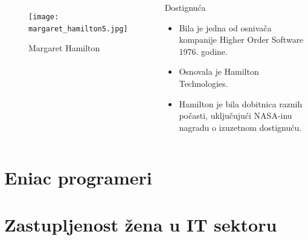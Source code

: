 \documentclass[aspectratio=169]{beamer}
\begin{document}
\begin{frame}
  
    \begin{columns}
        \begin{figure}[h]
    \centering
    \texttt{[image: margaret\_hamilton5.jpg]}
    \caption{Margaret Hamilton}
    \label{fig:my_label}
\end{figure}

        \begin{block}{Dostignuća}
            \begin{itemize}
                \item<1->Bila je jedna od osnivača kompanije Higher Order Software 1976. godine.

                \item<2->Osnovala je Hamilton Technologies.

                \item<3-> Hamilton je bila dobitnica raznih počasti, uključujući NASA-inu nagradu o izuzetnom dostignuću.
                
            \end{itemize}
        \end{block}        
    \end{columns}
   
\end{frame}


\section{Eniac programeri}



\section{Zastupljenost žena u IT sektoru}
\end{document}
